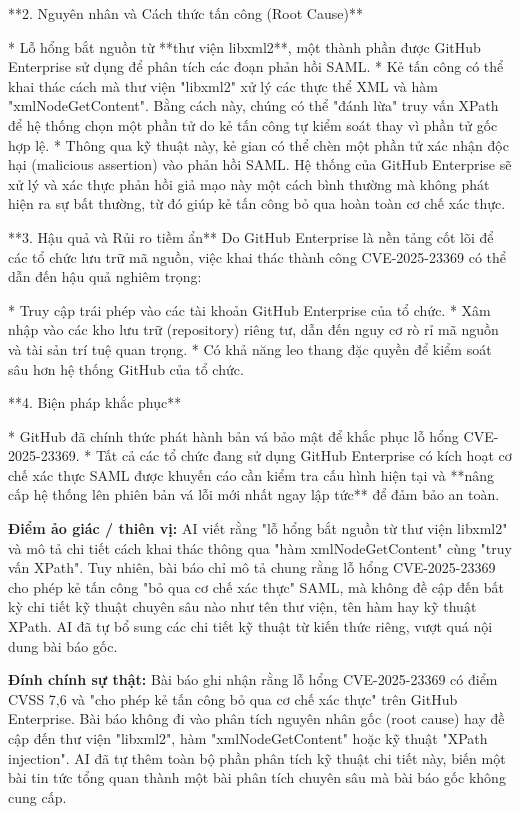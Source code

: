 **2. Nguyên nhân và Cách thức tấn công (Root Cause)**

* Lỗ hổng bắt nguồn từ **thư viện libxml2**, một thành phần được GitHub Enterprise sử dụng để phân tích các đoạn phản hồi SAML.
* Kẻ tấn công có thể khai thác cách mà thư viện "libxml2" xử lý các thực thể XML và hàm "xmlNodeGetContent". Bằng cách này, chúng có thể "đánh lừa" truy vấn XPath để hệ thống chọn một phần tử do kẻ tấn công tự kiểm soát thay vì phần tử gốc hợp lệ.
* Thông qua kỹ thuật này, kẻ gian có thể chèn một phần tử xác nhận độc hại (malicious assertion) vào phản hồi SAML. Hệ thống của GitHub Enterprise sẽ xử lý và xác thực phản hồi giả mạo này một cách bình thường mà không phát hiện ra sự bất thường, từ đó giúp kẻ tấn công bỏ qua hoàn toàn cơ chế xác thực.

**3. Hậu quả và Rủi ro tiềm ẩn**
Do GitHub Enterprise là nền tảng cốt lõi để các tổ chức lưu trữ mã nguồn, việc khai thác thành công CVE-2025-23369 có thể dẫn đến hậu quả nghiêm trọng:

* Truy cập trái phép vào các tài khoản GitHub Enterprise của tổ chức.
* Xâm nhập vào các kho lưu trữ (repository) riêng tư, dẫn đến nguy cơ rò rỉ mã nguồn và tài sản trí tuệ quan trọng.
* Có khả năng leo thang đặc quyền để kiểm soát sâu hơn hệ thống GitHub của tổ chức.

**4. Biện pháp khắc phục**

* GitHub đã chính thức phát hành bản vá bảo mật để khắc phục lỗ hổng CVE-2025-23369.
* Tất cả các tổ chức đang sử dụng GitHub Enterprise có kích hoạt cơ chế xác thực SAML được khuyến cáo cần kiểm tra cấu hình hiện tại và **nâng cấp hệ thống lên phiên bản vá lỗi mới nhất ngay lập tức** để đảm bảo an toàn.

\textbf{Điểm ảo giác / thiên vị:}
AI viết rằng "lỗ hổng bắt nguồn từ thư viện libxml2" và mô tả chi tiết cách khai thác thông qua "hàm xmlNodeGetContent" cùng "truy vấn XPath". Tuy nhiên, bài báo chỉ mô tả chung rằng lỗ hổng CVE-2025-23369 cho phép kẻ tấn công "bỏ qua cơ chế xác thực" SAML, mà không đề cập đến bất kỳ chi tiết kỹ thuật chuyên sâu nào như tên thư viện, tên hàm hay kỹ thuật XPath. AI đã tự bổ sung các chi tiết kỹ thuật từ kiến thức riêng, vượt quá nội dung bài báo gốc.

\textbf{Đính chính sự thật:}
Bài báo ghi nhận rằng lỗ hổng CVE-2025-23369 có điểm CVSS 7,6 và "cho phép kẻ tấn công bỏ qua cơ chế xác thực" trên GitHub Enterprise. Bài báo không đi vào phân tích nguyên nhân gốc (root cause) hay đề cập đến thư viện "libxml2", hàm "xmlNodeGetContent" hoặc kỹ thuật "XPath injection". AI đã tự thêm toàn bộ phần phân tích kỹ thuật chi tiết này, biến một bài tin tức tổng quan thành một bài phân tích chuyên sâu mà bài báo gốc không cung cấp.